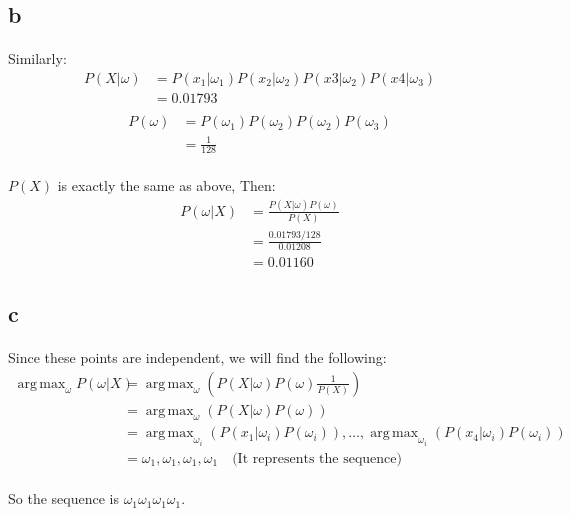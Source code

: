 \documentclass[]{article}
\DeclareMathOperator*{\argmax}{arg\,max}
\begin{document}
        \subsection{b}
            \paragraph{} Similarly:
            \begin{align*}
P(X|\omega) 
&=P(x_1|\omega_1)P(x_2|\omega_2)P(x3|\omega_2)P(x4|\omega_3)\\
&= 0.01793 \\
            \end{align*}
            \begin{align*}
P(\omega) &=P(\omega_1)P(\omega_2)P(\omega_2)P(\omega_3)\\
&=\frac{1}{128}
            \end{align*}
            \paragraph{}$P(X)$ is exactly the same as above, Then:
            \begin{align*}
P(\omega|X) 
&=\frac{P(X|\omega)P(\omega)}{P(X)}\\
&=\frac{0.01793/128}{0.01208}\\
&=0.01160
            \end{align*}
        \subsection{c}
            \paragraph{}Since these points are independent, we will find the following:
            \begin{align*}
\argmax_{\omega}{P(\omega|X)} 
&=\argmax_{\omega}{(P(X|\omega)P(\omega)\frac{1}{P(X)})}\\
&=\argmax_{\omega}{(P(X|\omega)P(\omega))} \\
&=\argmax_{\omega_i}{(P(x_1|\omega_i)P(\omega_i))},\dots,
  \argmax_{\omega_i}{(P(x_4|\omega_i)P(\omega_i))}\\
&=\omega_1,\omega_1,\omega_1,\omega_1 \quad \text{(It represents the sequence)}
            \end{align*}
            \paragraph{}So the sequence is $\omega_1\omega_1\omega_1\omega_1$.
\end{document}
